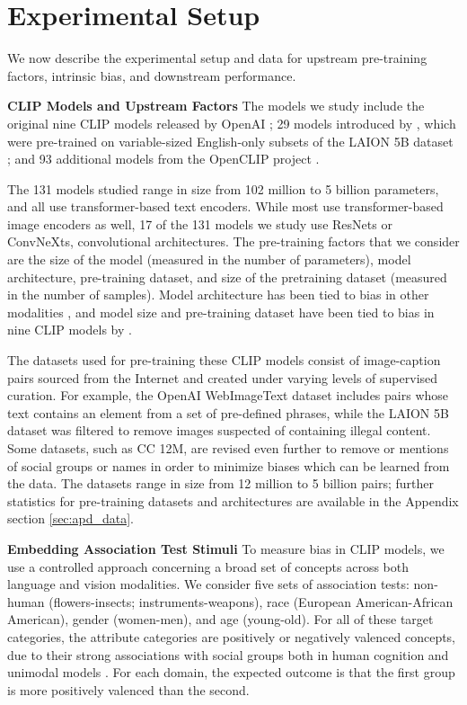 \section{Experimental Setup }
\label{sec:data}

We now describe the experimental setup and data for upstream pre-training factors, intrinsic bias, and downstream performance.


\noindent\textbf{CLIP Models and Upstream Factors}
The models we study include the original nine CLIP models released by OpenAI \cite{Radford2021LearningSupervision}; 29 models introduced by \citet{Cherti2023ReproducibleLearning}, which were pre-trained on variable-sized English-only subsets of the LAION 5B dataset \cite{Schuhmann2022LAION-5B:Models}; and 93 additional models from the OpenCLIP project \cite{Ilharco2021OpenCLIP}.

The 131 models studied range in size from 102 million to 5 billion parameters, and all use transformer-based text encoders. While most use transformer-based image encoders as well, 17 of the 131 models we study use ResNets or ConvNeXts, convolutional architectures. The pre-training factors that we consider are the size of the model (measured in the number of parameters), model architecture, pre-training dataset, and size of the pretraining dataset (measured in the number of samples). Model architecture has been tied to bias in other modalities \cite{Ladhak2023WhenSummarization}, and model size and pre-training dataset have been tied to bias in nine CLIP models by \citet{Berg2022ALearning}. 


The datasets used for pre-training these CLIP models consist of image-caption pairs sourced from the Internet and created under varying levels of supervised curation. For example, the OpenAI WebImageText dataset \cite{Radford2021LearningSupervision} includes pairs whose text contains an element from a set of pre-defined phrases, while the LAION 5B dataset \cite{Schuhmann2022LAION-5B:Models} was filtered to remove images suspected of containing illegal content. Some datasets, such as CC 12M, are revised even further to remove or mentions of social groups or names in order to minimize biases which can be learned from the data. The datasets range in size from 12 million to 5 billion pairs; further statistics for pre-training datasets and architectures are available in the Appendix section \ref{sec:apd_data}.

\noindent \textbf{Embedding Association Test Stimuli}
To measure bias in CLIP models, we use a controlled approach concerning a broad set of concepts across both language and vision modalities. We consider five sets of association tests: non-human (flowers-insects; instruments-weapons), race (European American-African American), gender (women-men), and age (young-old). For all of these target categories, the attribute categories are positively or negatively valenced concepts, due to their strong associations with social groups both in human cognition and unimodal models \citep{toney2020valnorm, harmon2013does}. For each domain, the expected outcome is that the first group is more positively valenced than the second. 

